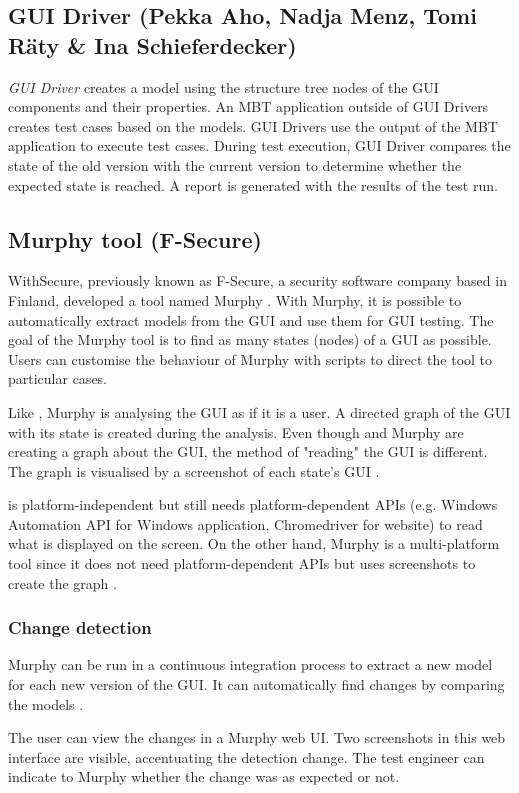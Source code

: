 \subsection{GUI Driver (Pekka Aho, Nadja Menz, Tomi Räty \& Ina Schieferdecker)}  \label{sec:gui-driver}
\emph{GUI Driver} \cite{aho2011automated} creates a model using the structure tree nodes of the GUI components and their properties. An MBT application \cite{mbt-tigris-org} outside of GUI Drivers creates test cases based on the models. GUI Drivers use the output of the MBT application to execute test cases. During test execution, GUI Driver compares the state of the old version with the current version to determine whether the expected state is reached. A report is generated with the results of the test run. 

\subsection{Murphy tool (F-Secure)} \label{sec:murphy-tool}
WithSecure, previously known as F-Secure, a security software company based in Finland, developed a tool named Murphy \cite{aho2013industrial}. With Murphy, it is possible to automatically extract models from the GUI and use them for GUI testing. The goal of the Murphy tool is to find as many states (nodes) of a GUI as possible. Users can customise the behaviour of Murphy with scripts to direct the tool to particular cases. 

Like \testar, Murphy is analysing the GUI as if it is a user. A directed graph of the GUI with its state is created during the analysis. Even though \testar and Murphy are creating a graph about the GUI, the method of "reading" the GUI is different. The graph is visualised by a screenshot of each state's GUI \cite{aho2014murphy}.

\testar is platform-independent but still needs platform-dependent APIs (e.g. Windows Automation API for Windows application, Chromedriver for website) to read what is displayed on the screen. On the other hand, Murphy is a multi-platform tool since it does not need platform-dependent APIs but uses screenshots to create the graph \cite{aho2013industrial}.

\subsubsection{Change detection}
Murphy can be run in a continuous integration process to extract a new model for each new version of the GUI. It can automatically find changes by comparing the models \cite{aho2014murphy}.  

The user can view the changes in a Murphy web UI. Two screenshots in this web interface are visible, accentuating the detection change. The test engineer can indicate to Murphy whether the change was as expected or not.
